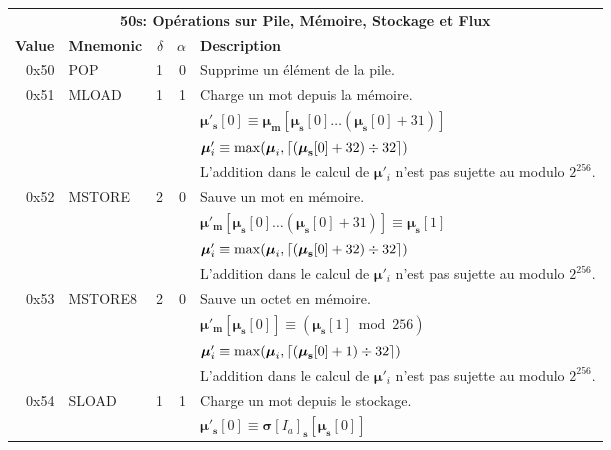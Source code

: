 \documentclass[9pt,oneside]{amsart}
\DeclarePairedDelimiter{\ceil}{\lceil}{\rceil}
\begin{document}
\begin{tabular*}{\columnwidth}[h]{rlrrl}
\toprule
\multicolumn{5}{c}{\textbf{50s: Opérations sur Pile, Mémoire, Stockage et Flux}} \vspace{5pt} \\
\textbf{Value} & \textbf{Mnemonic} & $\delta$ & $\alpha$ & \textbf{Description} \vspace{5pt} \\
0x50 & {\small POP} & 1 & 0 & Supprime un élément de la pile. \\
\midrule
0x51 & {\small MLOAD} & 1 & 1 & Charge un mot depuis la mémoire. \\
&&&& $\boldsymbol{\mu}'_\mathbf{s}[0] \equiv \boldsymbol{\mu}_\mathbf{m}[\boldsymbol{\mu}_\mathbf{s}[0] \dots (\boldsymbol{\mu}_\mathbf{s}[0] + 31) ]$ \\
&&&& $\boldsymbol{\mu}'_i \equiv \max(\boldsymbol{\mu}_i, \ceil{ (\boldsymbol{\mu}_\mathbf{s}[0] + 32) \div 32 })$ \\
&&&& L'addition dans le calcul de $\boldsymbol{\mu}'_i$ n'est pas sujette au modulo $2^{256}$. \\
\midrule
0x52 & {\small MSTORE} & 2 & 0 & Sauve un mot en mémoire. \\
&&&& $\boldsymbol{\mu}'_\mathbf{m}[ \boldsymbol{\mu}_\mathbf{s}[0] \dots (\boldsymbol{\mu}_\mathbf{s}[0] + 31) ] \equiv \boldsymbol{\mu}_\mathbf{s}[1]$ \\
&&&& $\boldsymbol{\mu}'_i \equiv \max(\boldsymbol{\mu}_i, \ceil{ (\boldsymbol{\mu}_\mathbf{s}[0] + 32) \div 32 })$ \\
&&&& L'addition dans le calcul de $\boldsymbol{\mu}'_i$ n'est pas sujette au modulo $2^{256}$. \\
\midrule
0x53 & {\small MSTORE8} & 2 & 0 & Sauve un octet en mémoire. \\
&&&& $\boldsymbol{\mu}'_\mathbf{m}[ \boldsymbol{\mu}_\mathbf{s}[0] ] \equiv (\boldsymbol{\mu}_\mathbf{s}[1] \bmod 256) $ \\
&&&& $\boldsymbol{\mu}'_i \equiv \max(\boldsymbol{\mu}_i, \ceil{ (\boldsymbol{\mu}_\mathbf{s}[0] + 1) \div 32 })$ \\
&&&& L'addition dans le calcul de $\boldsymbol{\mu}'_i$ n'est pas sujette au modulo $2^{256}$. \\
\midrule
0x54 & {\small SLOAD} & 1 & 1 & Charge un mot depuis le stockage. \\
&&&& $\boldsymbol{\mu}'_\mathbf{s}[0] \equiv \boldsymbol{\sigma}[I_a]_\mathbf{s}[\boldsymbol{\mu}_\mathbf{s}[0]]$ \\

\end{tabular*}
\end{document}
